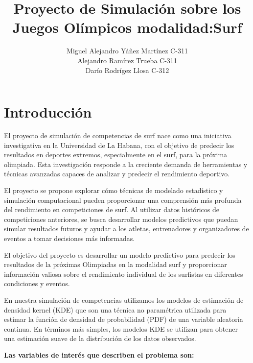\documentclass[12pt]{article}
\title{Proyecto de Simulación sobre los Juegos Olímpicos modalidad:Surf}
\author{Miguel Alejandro Yáñez Martínez C-311 \\ 
        Alejandro Ramírez Trueba C-311\\ 
        Darío Rodrígez Llosa C-312}
\begin{document}
\maketitle

\section*{Introducción}

El proyecto de simulación de competencias de surf nace como una iniciativa investigativa en la Universidad de La Habana, con el objetivo de predecir los resultados en deportes extremos, especialmente en el surf, para la próxima olimpiada. Esta investigación responde a la creciente demanda de herramientas y técnicas avanzadas capaces de analizar y predecir el rendimiento deportivo.

El proyecto se propone explorar cómo técnicas de modelado estadístico y simulación computacional pueden proporcionar una comprensión más profunda del rendimiento en competiciones de surf. Al utilizar datos históricos de competiciones anteriores, se busca desarrollar modelos predictivos que puedan simular resultados futuros y ayudar a los atletas, entrenadores y organizadores de eventos a tomar decisiones más informadas.

El objetivo del proyecto es desarrollar un modelo predictivo para predecir los resultados de la próximas Olimpiadas en la modalidad surf y proporcionar información valiosa sobre el rendimiento individual de los surfistas en diferentes condiciones y eventos.

En nuestra simulación de competencias utilizamos los modelos de estimación de densidad kernel (KDE) que son una técnica no paramétrica utilizada para estimar la función de densidad de probabilidad (PDF) de una variable aleatoria continua. En términos más simples, los modelos KDE se utilizan para obtener una estimación suave de la distribución de los datos observados.

\textbf{Las variables de interés que describen el problema son:}
\end{document}
